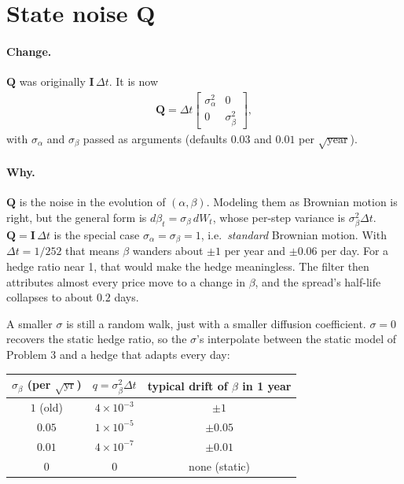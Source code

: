 \documentclass[11pt]{article}
\newcommand{\bs}[1]{\boldsymbol{#1}}
\begin{document}
\section{State noise $\bs{Q}$}

\paragraph{Change.} $\bs{Q}$ was originally $\bs{I}\,\Delta t$. It is now
\begin{gather*}
    \bs{Q} = \Delta t
    \begin{bmatrix} \sigma_\alpha^2 & 0 \\ 0 & \sigma_\beta^2 \end{bmatrix},
\end{gather*}
with $\sigma_\alpha$ and $\sigma_\beta$ passed as arguments (defaults $0.03$ and
$0.01$ per $\sqrt{\text{year}}$).

\paragraph{Why.} $\bs{Q}$ is the noise in the evolution of $(\alpha, \beta)$.
Modeling them as Brownian motion is right, but the general form is
$d\beta_t = \sigma_\beta\,dW_t$, whose per-step variance is
$\sigma_\beta^2\Delta t$. $\bs{Q} = \bs{I}\,\Delta t$ is the special case
$\sigma_\alpha = \sigma_\beta = 1$, i.e.\ \emph{standard} Brownian motion. With
$\Delta t = 1/252$ that means $\beta$ wanders about $\pm 1$ per year and
$\pm 0.06$ per day. For a hedge ratio near 1, that would make the hedge
meaningless. The filter then attributes almost every price move to a change in
$\beta$, and the spread's half-life collapses to about $0.2$ days.

A smaller $\sigma$ is still a random walk, just with a smaller diffusion
coefficient. $\sigma = 0$ recovers the static hedge ratio, so the $\sigma$'s
interpolate between the static model of Problem 3 and a hedge that adapts
every day:

\begin{center}
\begin{tabular}{ccc}
    \toprule
    $\sigma_\beta$ (per $\sqrt{\text{yr}}$) & $q = \sigma_\beta^2\Delta t$ & typical drift of $\beta$ in 1 year \\
    \midrule
    $1$ (old)  & $4\times10^{-3}$ & $\pm 1$ \\
    $0.05$     & $1\times10^{-5}$ & $\pm 0.05$ \\
    $0.01$     & $4\times10^{-7}$ & $\pm 0.01$ \\
    $0$        & $0$              & none (static) \\
    \bottomrule
\end{tabular}
\end{center}
\end{document}
